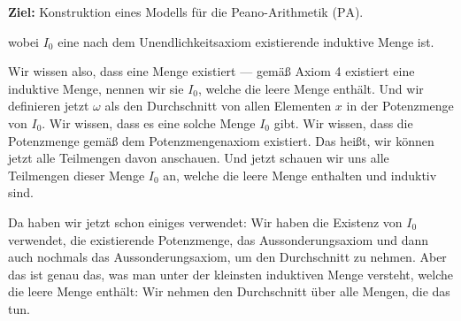 \begin{math-stroke}
\textbf{Ziel:} Konstruktion eines Modells für die Peano-Arithmetik ($\text{PA}$).

wobei $I_0$ eine nach dem Unendlichkeitsaxiom existierende induktive Menge ist. 
\end{math-stroke}

\begin{spoken-clean}[00:46:16 - 00:47:57]
Wir wissen also, dass eine Menge existiert --- gemäß Axiom 4 existiert eine induktive Menge, nennen wir sie $I_0$, welche die leere Menge enthält. Und wir definieren jetzt $\omega$ als den Durchschnitt von allen Elementen $x$ in der Potenzmenge von $I_0$. Wir wissen, dass es eine solche Menge $I_0$ gibt. Wir wissen, dass die Potenzmenge gemäß dem Potenzmengenaxiom existiert. Das heißt, wir können jetzt alle Teilmengen davon anschauen. Und jetzt schauen wir uns alle Teilmengen dieser Menge $I_0$ an, welche die leere Menge enthalten und induktiv sind.

Da haben wir jetzt schon einiges verwendet: Wir haben die Existenz von $I_0$ verwendet, die existierende Potenzmenge, das Aussonderungsaxiom und dann auch nochmals das Aussonderungsaxiom, um den Durchschnitt zu nehmen. Aber das ist genau das, was man unter der kleinsten induktiven Menge versteht, welche die leere Menge enthält: Wir nehmen den Durchschnitt über alle Mengen, die das tun.
\end{spoken-clean}

